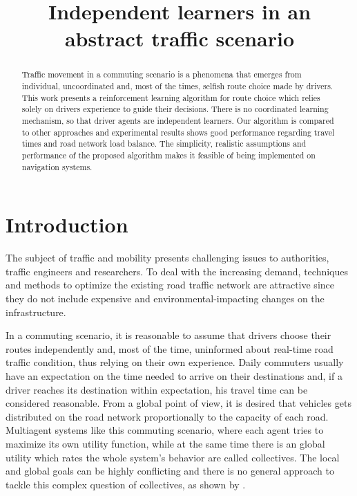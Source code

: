 \documentclass[12pt]{llncs}
\title{Independent learners in an abstract traffic scenario}
\author{
}
\institute{
 }
\begin{document}
\maketitle

\begin{abstract}
Traffic movement in a commuting scenario is a phenomena that emerges from individual, uncoordinated and, most of the times, selfish route choice made by drivers. This work presents a reinforcement learning algorithm for route choice which relies solely on drivers experience to guide their decisions. There is no coordinated learning mechanism, so that driver agents are independent learners. Our algorithm is compared to other approaches and experimental results shows good performance regarding travel times and road network load balance. The simplicity, realistic assumptions and performance of the proposed algorithm makes it feasible of being implemented on navigation systems.
\end{abstract}





\section{Introduction}
\label{sec:intro}

The subject of traffic and mobility presents challenging issues to authorities, traffic engineers and researchers. To deal with the increasing demand, techniques and methods to optimize the existing road traffic network are attractive since they do not include expensive and environmental-impacting changes on the infrastructure.

In a commuting scenario, it is reasonable to assume that drivers choose their routes independently and, most of the time, uninformed about real-time road traffic condition, thus relying on their own experience. Daily commuters usually have an expectation on the time needed to arrive on their destinations and, if a driver reaches its destination within expectation, his travel time can be considered  reasonable. From a global point of view, it is desired that vehicles gets distributed on the road network proportionally to the capacity of each road. Multiagent systems like this commuting scenario, where each agent tries to maximize its own utility function, while at the same time there is an global utility which rates the whole system's behavior are called collectives. The local and global goals can be highly conflicting and there is no general approach to tackle this complex question of collectives, as shown by \cite{Tumer&Wolpert2004}.
\end{document}

